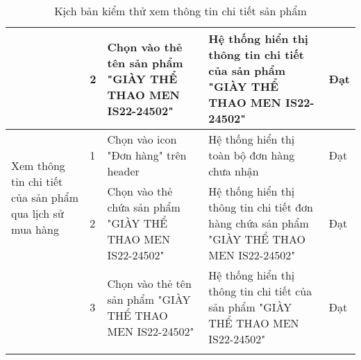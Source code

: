 {\begin{longtable}{| p{2.5cm}| p{1cm}| p{5.5cm}| p{4.5cm} | p{1.5cm} |}
        \cline{2-5}
                                                                                                   & 2                  &
        Chọn vào thẻ tên sản phẩm "GIÀY THỂ THAO MEN IS22-24502"                                   &
        Hệ thống hiển thị thông tin chi tiết của sản phẩm "GIÀY THỂ THAO MEN IS22-24502"           &
        Đạt                                                                                                                                                                                       \\
        \hline
        \multirow[t]{2}{2.5cm}{Xem thông tin chi tiết của sản phẩm qua lịch sử mua hàng}           &
        1                                                                                          &
        Chọn vào icon "Đơn hàng" trên header                                                       &
        Hệ thống hiển thị toàn bộ đơn hàng chưa nhận                                               &
        Đạt                                                                                                                                                                                       \\
        \cline{2-5}
                                                                                                   & 2                  &
        Chọn vào thẻ chứa sản phẩm "GIÀY THỂ THAO MEN IS22-24502"                                  &
        Hệ thống hiển thị thông tin chi tiết đơn hàng chứa sản phẩm "GIÀY THỂ THAO MEN IS22-24502" &
        Đạt                                                                                                                                                                                       \\
        \cline{2-5}
                                                                                                   & 3                  &
        Chọn vào thẻ tên sản phẩm "GIÀY THỂ THAO MEN IS22-24502"                                   &
        Hệ thống hiển thị thông tin chi tiết của sản phẩm "GIÀY THỂ THAO MEN IS22-24502"           &
        Đạt                                                                                                                                                                                       \\
        \hline
        \caption{Kịch bản kiểm thử xem thông tin chi tiết sản phẩm}
    \end{longtable}
}

